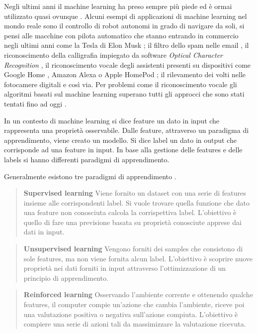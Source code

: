 \documentclass[../main.tex]{subfiles}
\begin{document}
Negli ultimi anni il machine learning ha preso sempre più piede ed è ormai utilizzato quasi ovunque \cite{compIntelligence}. Alcuni esempi di applicazioni di machine learning nel mondo reale sono il controllo di robot autonomi in grado di navigare da soli, si pensi alle macchine con pilota automatico che stanno entrando in commercio negli ultimi anni come la Tesla di Elon Musk \cite{tesla}; il filtro dello spam nelle email \cite{spamemail}, il riconoscimento della calligrafia impiegato da software \textit{Optical Character Recognition} \cite{ocr}, il riconoscimento vocale degli assistenti presenti su dispositivi come Google Home \cite{googlehome}, Amazon Alexa \cite{amazonalexa} o Apple HomePod \cite{applehomepod}; il rilevamento dei volti nelle fotocamere digitali \cite{facialrecognition} e così via.
Per problemi come il riconoscimento vocale gli algoritmi basati sul machine learning superano tutti gli approcci che sono stati tentati fino ad oggi \cite{mldef}.

In un contesto di machine learning si dice feature un dato in input che rappresenta una proprietà osservabile. Dalle feature, attraverso un paradigma di apprendimento, viene creato un modello. Si dice label un dato in output che corrisponde ad una feature in input. In base alla gestione delle features e delle labels si hanno differenti paradigmi di apprendimento.

Generalmente esistono tre paradigmi di apprendimento \cite{ai}.
\begin{verse}
				\textbf{Supervised learning} Viene fornito un dataset con una serie di features insieme alle corrispondenti label. Si vuole trovare quella funzione che dato una feature non conosciuta calcola la corrispettiva label. L'obiettivo è quello di fare una previsione basata su proprietà conosciute apprese dai dati in input.
\end{verse}

\begin{verse}
				\textbf{Unsupervised learning} Vengono forniti dei samples che consistono di sole features, ma non viene fornita alcun label. L'obiettivo è scoprire nuove proprietà nei dati forniti in input attraverso l'ottimizzazione di un principio di apprendimento.
\end{verse}

\begin{verse}
				\textbf{Reinforced learning} Osservando l'ambiente corrente e ottenendo qualche features, il computer compie un'azione che cambia l'ambiente, riceve poi una valutazione positiva o negativa sull'azione compiuta. L'obiettivo è compiere una serie di azioni tali da massimizzare la valutazione ricevuta.
\end{verse}
\end{document}
